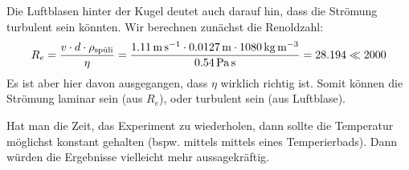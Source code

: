 		Die Luftblasen hinter der Kugel deutet auch darauf hin, dass die Strömung turbulent sein könnten. Wir berechnen zunächst die Renoldzahl:
		\begin{align}
			R_e = \frac{v\cdot d \cdot \rho_\spuli}{\eta} = \frac{\SI{1.11}{\meter\per\second}\cdot \SI{0.0127}{\meter} \cdot \SI{1080}{\kilo\gram\per\meter\cubed} }{\SI{0.54}{\pascal\second}} = \num{28.194} \ll 2000
		\end{align}
		Es ist aber hier davon ausgegangen, dass $\eta$ wirklich richtig ist. Somit können die Strömung laminar sein (aus $R_e$), oder turbulent sein (aus Luftblase).

		Hat man die Zeit, das Experiment zu wiederholen, dann sollte die Temperatur möglichst konstant gehalten (bspw. mittels mittels eines Temperierbads). Dann würden die Ergebnisse vielleicht mehr aussagekräftig.